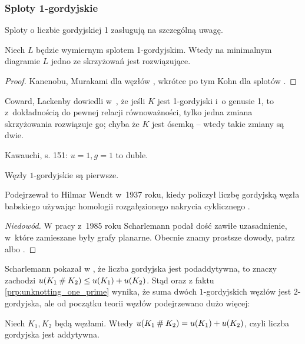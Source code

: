 
\subsubsection{Sploty 1-gordyjskie}
Sploty o liczbie gordyjskiej 1 zasługują na szczególną uwagę.

\begin{proposition}
    Niech $L$ będzie wymiernym splotem 1-gordyjskim.
%
    Wtedy na minimalnym diagramie $L$ jedno ze skrzyżowań jest rozwiązujące.
\end{proposition}

\begin{proof}
    Kanenobu, Murakami dla węzłów \cite{kanenobumurakami86}, wkrótce po tym Kohn dla splotów \cite{kohn91}.
\end{proof}

Coward, Lackenby dowiedli w~\cite{coward11}, że jeśli $K$ jest 1-gordyjski i~o genusie 1, to z~dokładnością do pewnej relacji równoważności, tylko jedna zmiana skrzyżowania rozwiązuje go; chyba że $K$ jest ósemką -- wtedy takie zmiany są dwie.

\begin{tobedone}
    Kawauchi, s. 151: $u = 1, g = 1$ to duble.
\end{tobedone}

\begin{proposition}
    \label{prp:unknotting_one_prime}
    Węzły $1$-gordyjskie są pierwsze.
\end{proposition}

Podejrzewał to Hilmar Wendt w~1937 roku, kiedy policzył liczbę gordyjską węzła babskiego używając homologii rozgałęzionego nakrycia cyklicznego \cite{wendt37}.

\begin{proof}[Niedowód]
    W pracy \cite{scharlemann85} z~1985 roku Scharlemann podał dość zawiłe uzasadnienie, w~które zamieszane były grafy planarne.
    Obecnie znamy prostsze dowody, patrz \cite{lackenby97} albo \cite{zhang91}.
\end{proof}

Scharlemann pokazał w \cite[wniosek 1.6]{scharlemann98}, że liczba gordyjska jest podaddytywna, to znaczy zachodzi $u(K_1 \mathbin{\#} K_2) \le u(K_1) + u(K_2)$.
Stąd oraz z faktu \ref{prp:unknotting_one_prime} wynika, że suma dwóch $1$-gordyjskich węzłów jest $2$-gordyjska, ale od początku teorii węzłów podejrzewano dużo więcej:

\begin{conjecture}
    Niech $K_1, K_2$ będą węzłami.
    Wtedy $u(K_1 \mathbin{\#} K_2) = u(K_1) + u(K_2)$, czyli liczba gordyjska jest addytywna.
\end{conjecture}
